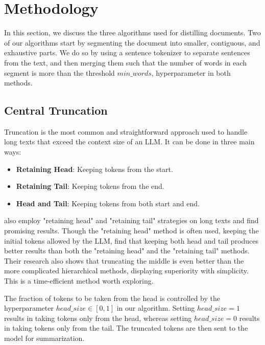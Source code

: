 \section{Methodology}
	\label{sec:methodology}

	In this section, we discuss the three algorithms used for distilling documents.
	Two of our algorithms start by segmenting the document into smaller, contiguous, and exhaustive
	parts.
	We do so by using a sentence tokenizer to separate sentences from the text, and then merging
	them such that the number of words in each segment is more than the threshold $min\_words$,
	hyperparameter in both methods.


	\subsection{Central Truncation}
		\label{method:truncation}

		Truncation is the most common and straightforward approach used to handle long texts that exceed
		the context size of an LLM.
		It can be done in three main ways:

		\begin{itemize}
			\item \textbf{Retaining Head}: Keeping tokens from the start.
			\item \textbf{Retaining Tail}: Keeping tokens from the end.
			\item \textbf{Head and Tail}: Keeping tokens from both start and end.
		\end{itemize}

		\citet{worsham-kalita-2018-genre} also employ "retaining head" and "retaining tail" strategies
		on long texts and find promising results.
		Though the "retaining head" method is often used, keeping the initial tokens allowed by the LLM,
		\citet{sun2019fine} find that keeping both head and tail produces better results than both the
		"retaining head" and the "retaining tail" methods.
		Their research also shows that truncating the middle is even better than the more complicated
		hierarchical methods, displaying superiority with simplicity.
		This is a time-efficient method worth exploring.

		The fraction of tokens to be taken from the head is controlled by the hyperparameter $head\_size
		\in [0, 1]$ in our algorithm.
		Setting $head\_size = 1$ results in taking tokens only from the head, whereas setting $head\_size
		= 0$ results in taking tokens only from the tail.
		The truncated tokens are then sent to the model for summarization.


